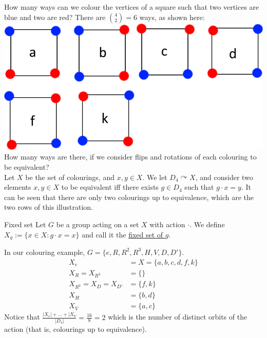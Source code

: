 \documentclass[12pt]{article}
\begin{document}
	\begin{myex}{}{}
		How many ways can we colour the vertices of a square such that two vertices are blue and two are red? There are $\binom{4}{2}=6$ ways, as shown here:\\
		\includegraphics[scale=0.7]{Fig2.png}\\
		How many ways are there, if we consider flips and rotations of each colouring to be equivalent?\\
		
		Let $X$ be the set of colourings, and $x, y\in X$. We let $D_4\curvearrowright X$, and consider two elements $x, y\in X$ to be equivalent iff there exists $g\in D_4$ such that $g\cdot x=y$. It can be seen that there are only two colourings up to equivalence, which are the two rows of this illustration.
	\end{myex}
	
	\begin{mydef}{Fixed set}{}
		Let $G$ be a group acting on a set $X$ with action $\cdot$. We define $X_g:=\{x\in X:g\cdot x=x\}$ and call it the \underline{fixed set of $g$}.
	\end{mydef}
	
	\begin{myex}{}{}
		In our colouring example, $G=\{e, R, R^2, R^3, H, V, D, D'\}$.
		\begin{align*}
			X_e&=X=\{a, b, c, d, f, k\}\\
			X_R=X_{R^3}&=\{\}\\
			X_{R^2}=X_D=X_{D'}&=\{f, k\}\\
			X_H&=\{b, d\}\\
			X_V&=\{a, c\}
		\end{align*}
		Notice that $\frac{|X_e|+\dots+|X_V}{|D_4|}=\frac{16}{8}=2$ which is the number of distinct orbits of the action (that is, colourings up to equivalence).
	\end{myex}
	
\end{document}
